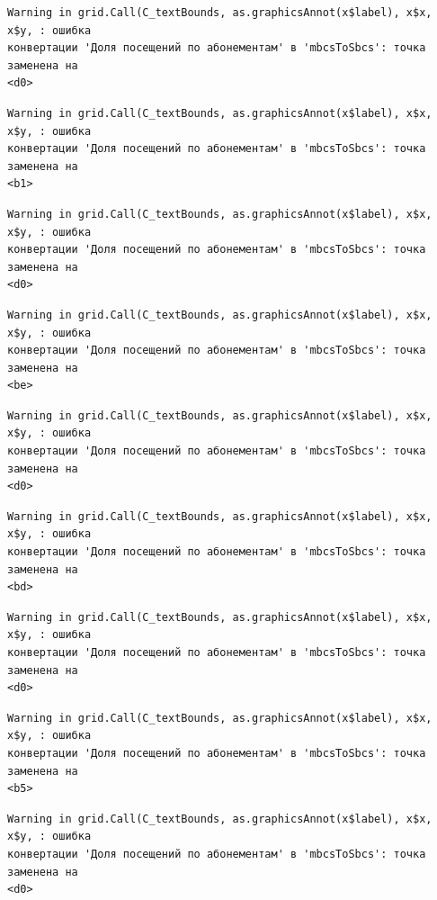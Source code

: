 \documentclass[
  letterpaper,
  DIV=11,
  numbers=noendperiod]{scrreprt}
\begin{document}
\begin{verbatim}
Warning in grid.Call(C_textBounds, as.graphicsAnnot(x$label), x$x, x$y, : ошибка
конвертации 'Доля посещений по абонементам' в 'mbcsToSbcs': точка заменена на
<d0>
\end{verbatim}

\begin{verbatim}
Warning in grid.Call(C_textBounds, as.graphicsAnnot(x$label), x$x, x$y, : ошибка
конвертации 'Доля посещений по абонементам' в 'mbcsToSbcs': точка заменена на
<b1>
\end{verbatim}

\begin{verbatim}
Warning in grid.Call(C_textBounds, as.graphicsAnnot(x$label), x$x, x$y, : ошибка
конвертации 'Доля посещений по абонементам' в 'mbcsToSbcs': точка заменена на
<d0>
\end{verbatim}

\begin{verbatim}
Warning in grid.Call(C_textBounds, as.graphicsAnnot(x$label), x$x, x$y, : ошибка
конвертации 'Доля посещений по абонементам' в 'mbcsToSbcs': точка заменена на
<be>
\end{verbatim}

\begin{verbatim}
Warning in grid.Call(C_textBounds, as.graphicsAnnot(x$label), x$x, x$y, : ошибка
конвертации 'Доля посещений по абонементам' в 'mbcsToSbcs': точка заменена на
<d0>
\end{verbatim}

\begin{verbatim}
Warning in grid.Call(C_textBounds, as.graphicsAnnot(x$label), x$x, x$y, : ошибка
конвертации 'Доля посещений по абонементам' в 'mbcsToSbcs': точка заменена на
<bd>
\end{verbatim}

\begin{verbatim}
Warning in grid.Call(C_textBounds, as.graphicsAnnot(x$label), x$x, x$y, : ошибка
конвертации 'Доля посещений по абонементам' в 'mbcsToSbcs': точка заменена на
<d0>
\end{verbatim}

\begin{verbatim}
Warning in grid.Call(C_textBounds, as.graphicsAnnot(x$label), x$x, x$y, : ошибка
конвертации 'Доля посещений по абонементам' в 'mbcsToSbcs': точка заменена на
<b5>
\end{verbatim}

\begin{verbatim}
Warning in grid.Call(C_textBounds, as.graphicsAnnot(x$label), x$x, x$y, : ошибка
конвертации 'Доля посещений по абонементам' в 'mbcsToSbcs': точка заменена на
<d0>
\end{verbatim}
\end{document}
